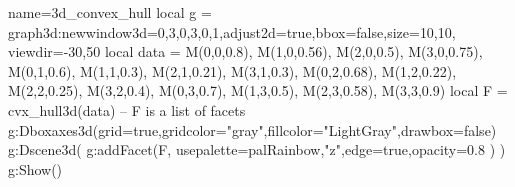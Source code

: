 \documentclass[border=5pt]{standalone}%
\begin{document}
\begin{luadraw}{name=3d_convex_hull}
local g = graph3d:new{window3d={0,3,0,3,0,1},adjust2d=true,bbox=false,size={10,10}, viewdir={-30,50}}
local data = {
M(0,0,0.8),
M(1,0,0.56),
M(2,0,0.5),
M(3,0,0.75),
M(0,1,0.6),
M(1,1,0.3),
M(2,1,0.21),
M(3,1,0.3),
M(0,2,0.68),
M(1,2,0.22),
M(2,2,0.25),
M(3,2,0.4),
M(0,3,0.7),
M(1,3,0.5),
M(2,3,0.58),
M(3,3,0.9)}
local F = cvx_hull3d(data) -- F is a list of facets
g:Dboxaxes3d({grid=true,gridcolor="gray",fillcolor="LightGray",drawbox=false})
g:Dscene3d(  g:addFacet(F, {usepalette={palRainbow,"z"},edge=true,opacity=0.8} ) )
g:Show()
\end{luadraw}
\end{document}
